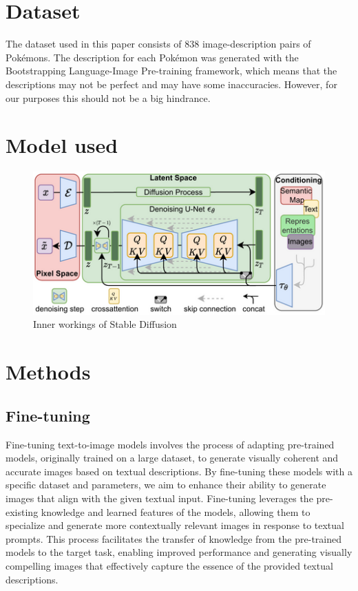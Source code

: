 \documentclass[conference]{IEEEtran}
\begin{document}
\section{Dataset}
The dataset used in this paper \cite{pinkney2022pokemon} consists of 838 image-description pairs of Pokémons. The description for each Pokémon was generated with the Bootstrapping Language-Image Pre-training framework, which means that the descriptions may not be perfect and may have some inaccuracies. However, for our purposes this should not be a big hindrance.

\section{Model used}

\begin{figure}
\centerline{\includegraphics[scale=1.8]{diff.png}}
\caption{Inner workings of Stable Diffusion}
\label{fig}
\end{figure}

\section{Methods}

\subsection{Fine-tuning}
Fine-tuning text-to-image models involves the process of adapting pre-trained models, originally trained on a large dataset, to generate visually coherent and accurate images based on textual descriptions. By fine-tuning these models with a specific dataset and parameters, we aim to enhance their ability to generate images that align with the given textual input. Fine-tuning leverages the pre-existing knowledge and learned features of the models, allowing them to specialize and generate more contextually relevant images in response to textual prompts. This process facilitates the transfer of knowledge from the pre-trained models to the target task, enabling improved performance and generating visually compelling images that effectively capture the essence of the provided textual descriptions.
\end{document}

